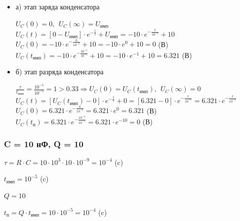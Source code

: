 \begin{itemize}
\item[] а) этап заряда конденсатора

		$U_C(0) = 0,\ \ U_C(\infty) = U_\text{имп}$\\
		$U_C(t) = [0 - U_\text{имп}] \cdot e^{-\frac{t}{\tau}} + U_\text{имп} = -10 \cdot e^{-\frac{t}{10^{-5}}} + 10$\\
		$U_C(0) = -10 \cdot e^{-\frac{0}{10^{-5}}} + 10 = -10 \cdot e^0 + 10 = 0$ (В)\\
		$U_C(t_\text{имп}) = -10 \cdot e^{-\frac{10^{-5}}{10^{-5}}} + 10 = -10 \cdot e^{-1} + 10 = 6.321$ (В)\\

\item[] б) этап разряда конденсатора

		$\frac{\tau}{t_\text{имп}} = \frac{10^{-5}}{10^{-5}} = 1 > 0.33 \Rightarrow U_C(0) = U_C(t_\text{имп}),\ \ U_C(\infty) = 0$\\
		$U_C(t) = [U_C(t_\text{имп}) - 0] \cdot e^{-\frac{t}{\tau}} + 0 =  [6.321 - 0] \cdot e^{-\frac{t}{10^{-5}}} = 6.321 \cdot e^{-\frac{t}{10^{-5}}}$\\
		$U_C(0) = 6.321 \cdot e^{-\frac{0}{10^{-5}}} = 6.321 \cdot e^0 = 6.321$ (В)\\
		$U_C(t_\text{п}) = 6.321 \cdot e^{-\frac{10^{-4}}{10^{-5}}} = 6.321 \cdot e^{-10} = 0$ (В)\\
		
\end{itemize}

\subsubsection{C = 10 нФ, Q = 10}

		$\tau = R \cdot C = 10 \cdot 10^3 \cdot 10 \cdot 10^{-9} = 10^{-4}$ (c)
		
		$t_\text{имп} = 10^{-5}$ (c)
		
		$Q = 10$		
		
		$t_\text{п} = Q \cdot t_\text{имп} = 10 \cdot 10^{-5} = 10^{-4}$ (c)

